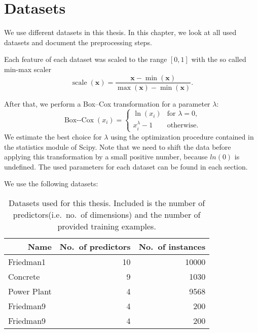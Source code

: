 \chapter{Datasets}\label{cha:datasets}
We use different datasets in this thesis.
In this chapter, we look at all used datasets and document the preprocessing
steps.

Each feature of each dataset was scaled to the range \([0,1]\) with the so called min-max
scaler
\begin{equation*}
  \operatorname{scale}(\bm{x}) = \frac{\bm{x} - \min({\bm{x}})}{\max{(\bm{x}) - \min(\bm{x})}}.
\end{equation*}

After that, we perform a Box--Cox transformation for a parameter \(\lambda\):
\begin{equation*}
  \operatorname{Box--Cox}(x_i) =
  \begin{cases}
    \ln(x_i) & \text{for } \lambda = 0, \\
    x_i^\lambda - 1 & \text{otherwise}.
  \end{cases}
\end{equation*}
We estimate the best choice for \(\lambda\) using the optimization procedure
contained in the statistics module of Scipy.
Note that we need to shift the data before applying this transformation by a
small positive number, because \(ln(0)\) is undefined.
The used parameters for each dataset can be found in each section.

We use the following datasets:

\begin{table}[h]
\begin{tabular}[c]{lrr}
  \toprule \multicolumn{1}{r}{\textbf{Name}}
& \multicolumn{1}{r}{\textbf{No.~of predictors}}
& \multicolumn{1}{r}{\textbf{No.~of instances}}
\\\midrule
  Friedman1 & 10 & 10000 \\
  Concrete & 9 & 1030 \\
  Power Plant & 4 & 9568 \\
  Friedman9 & 4  & 200 \\
  Friedman9 & 4  & 200
\\\bottomrule
\end{tabular}
\caption[List of Datasets]{Datasets used for this thesis.
  Included is the number of predictors(i.e.~no.~of dimensions) and the number of provided training examples.}
\end{table}

